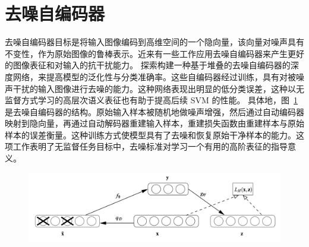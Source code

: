 \section{去噪自编码器}
去噪自编码器目标是将输入图像编码到高维空间的一个隐向量，该向量对噪声具有不变性，作为原始图像的鲁棒表示。近来有一些工作应用去噪自编码器来产生更好的图像表征和对输入的抗干扰能力。
\citet{vincent2010stacked} 探索构建一种基于堆叠的去噪自编码器的深度网络，来提高模型的泛化性与分类准确率。这些自编码器经过训练，具有对被噪声干扰的输入图像进行去噪的能力。这种网络表现出明显的低分类误差，这种以无监督方式学习的高层次语义表征也有助于提高后续 SVM 的性能。
具体地，图~\ref{c2_fig10}是去噪自编码器的结构。原始输入样本被随机地做噪声增强，然后通过自动编码器映射到隐向量，再通过自动解码器重建输入样本，重建损失函数由重建样本与原始样本的误差衡量。这种训练方式使模型具有了去噪和恢复原始干净样本的能力。这项工作表明了无监督任务目标中，去噪标准对学习一个有用的高阶表征的指导意义。
    \begin{figure}[tbp]
        \centering 
        \includegraphics[width=1.0\textwidth]{img/c2/rel_b4.png}
        \label{c2_fig10}
    \end{figure}

